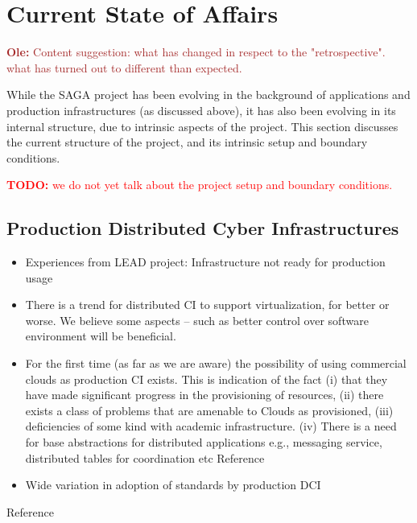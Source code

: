 \documentclass{article}
\newcommand{\B}[1]{\textbf{#1}}
\newcommand{\todo}[1]{{\textcolor{red}{\B{TODO:} #1 }}}
\newcommand{\ownote}[1]{{\textcolor{Brown}{   \B{Ole:     } #1 }}}
\newcommand{\todo}[1]{}
\newcommand{\ownote}[1]{}
\begin{document}

\section{Current State of Affairs}
\label{sec:state}

 \ownote{Content suggestion: what has changed in respect to the
 "retrospective". what has turned out to different than expected.}

While the SAGA project has been evolving in the background of
applications and production infrastructures (as discussed above), it
has also been evolving in its internal structure, due to intrinsic
aspects of the project.  This section discusses the current structure
of the project, and its intrinsic setup and boundary conditions.

\todo{we do not yet talk about the project setup and boundary
  conditions.}


 \subsection{Production Distributed Cyber Infrastructures}
  
   \begin{itemize}
   \item Experiences from LEAD project: Infrastructure not ready for
     production usage
    \item There is a trend for distributed CI to support
      virtualization, for better or worse. We believe some aspects --
      such as better control over software environment will be
      beneficial. 
    \item For the first time (as far as we are aware) the possibility
      of using commercial clouds as production CI exists. This is
      indication of the fact (i) that they have made significant
      progress in the provisioning of resources, (ii) there exists a
      class of problems that are amenable to Clouds as provisioned,
      (iii) deficiencies of some kind with academic infrastructure.
      (iv) There is a need for base abstractions for distributed
      applications e.g., messaging service, distributed tables for
      coordination etc Reference~\cite{1542058}
      \item Wide variation in adoption of standards by production DCI
    \end{itemize}

   Reference~\cite{dpa-pdci-tr}
\end{document}
